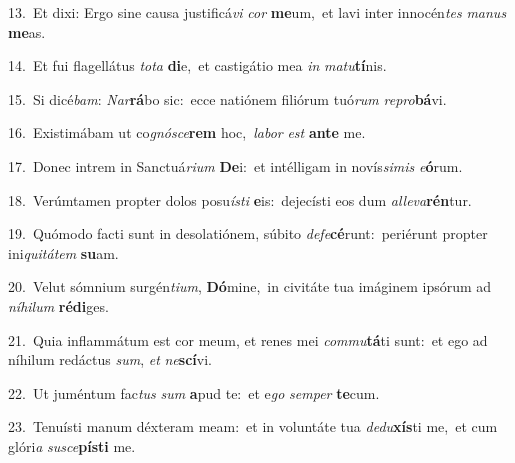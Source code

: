 {\numbfont\textcolor{\numbcolor}{13.}}~Et dixi: Ergo sine causa justificá\textit{vi} \textit{cor} \textbf{me}\-um,~\star et lavi inter innocén\textit{tes} \textit{ma}\-\textit{nus} \textbf{me}\-as.\par
{\numbfont\textcolor{\numbcolor}{14.}}~Et fui flagellátus \textit{to}\-\textit{ta} \textbf{di}\-e,~\star et castigátio mea \textit{in} \textit{ma}\-\textit{tu}\textbf{tí}nis.\par
{\numbfont\textcolor{\numbcolor}{15.}}~Si dicé\-\textit{bam}\-: \textit{Nar}\-\textbf{rá}bo sic:~\star ecce natiónem filiórum tuó\textit{rum} \textit{re}\-\textit{pro}\textbf{bá}vi.\par
{\numbfont\textcolor{\numbcolor}{16.}}~Existimábam ut co\-\textit{gnó}\-\textit{sce}\textbf{rem} hoc,~\star \textit{la}\-\textit{bor} \textit{est} \textbf{an}\-\textbf{te} me.\par
{\numbfont\textcolor{\numbcolor}{17.}}~Donec intrem in Sanctuá\-\textit{ri}\-\textit{um} \textbf{De}\-i:~\star et intélligam in novís\-\textit{si}\-\textit{mis} \textit{e}\-\textbf{ó}rum.\par
{\numbfont\textcolor{\numbcolor}{18.}}~Verúmtamen propter dolos posu\-\textit{ís}\-\textit{ti} \textbf{e}\-is:~\star dejecísti eos dum \textit{al}\-\textit{le}\textit{va}\textbf{rén}tur.\par
{\numbfont\textcolor{\numbcolor}{19.}}~Quómodo facti sunt in desolatiónem, súbito \textit{de}\-\textit{fe}\textbf{cé}runt:~\star periérunt propter ini\-\textit{qui}\-\textit{tá}\textit{tem} \textbf{su}\-am.\par
{\numbfont\textcolor{\numbcolor}{20.}}~Velut sómnium surgén\-\textit{ti}\-\textit{um}, \textbf{Dó}\-mine,~\star in civitáte tua imáginem ipsórum ad \textit{ní}\-\textit{hi}\textit{lum} \textbf{réd}\-\textbf{i}ges.\par
{\numbfont\textcolor{\numbcolor}{21.}}~Quia inflammátum est cor meum, et renes mei \textit{com}\-\textit{mu}\textbf{tá}ti sunt:~\star et ego ad níhilum redáctus \textit{sum}\-, \textit{et} \textit{ne}\-\textbf{scí}vi.\par
{\numbfont\textcolor{\numbcolor}{22.}}~Ut juméntum fac\textit{tus} \textit{sum} \textbf{a}\-pud te:~\star et e\textit{go} \textit{sem}\-\textit{per} \textbf{te}\-cum.\par
{\numbfont\textcolor{\numbcolor}{23.}}~Tenuísti manum déxteram meam:~\dagger et in voluntáte tua \textit{de}\-\textit{du}\textbf{xís}ti me,~\star et cum glóri\textit{a} \textit{su}\-\textit{sce}\textbf{pís}\textbf{ti} me.\par
